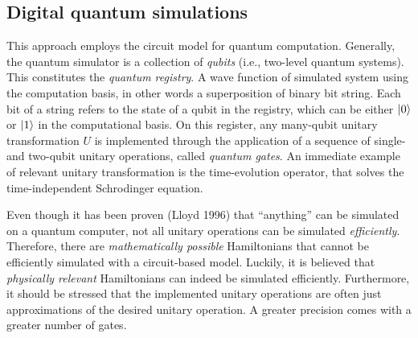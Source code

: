 
\subsection{Digital quantum simulations}
\label{sub:digital_quantum_simulations}

This approach employs the circuit model for quantum computation.
Generally, the quantum simulator is a collection of \emph{qubits} (i.e., two-level quantum systems).
This constitutes the \emph{quantum registry}.
A wave function of simulated system using the computation basis, in other words a superposition of binary bit string.
Each bit of a string refers to the state of a qubit in the registry, which can be either $\ket{0}$ or $\ket{1}$ in the computational basis.
On this register, any many-qubit unitary transformation $U$ is implemented through the application of a sequence of single- and two-qubit unitary operations, called \emph{quantum gates}.
An immediate example of relevant unitary transformation is the time-evolution operator, that solves the time-independent Schrodinger equation.

Even though it has been proven (Lloyd 1996\citneeded) that ``anything'' can be simulated on a quantum computer, not all unitary operations can be simulated \emph{efficiently}.
Therefore, there are \emph{mathematically possible} Hamiltonians that cannot be efficiently simulated with a circuit-based model.
Luckily, it is believed that \emph{physically relevant} Hamiltonians can indeed be simulated efficiently.
Furthermore, it should be stressed that the implemented unitary operations are often just approximations of the desired unitary operation.
A greater precision comes with a greater number of gates.


